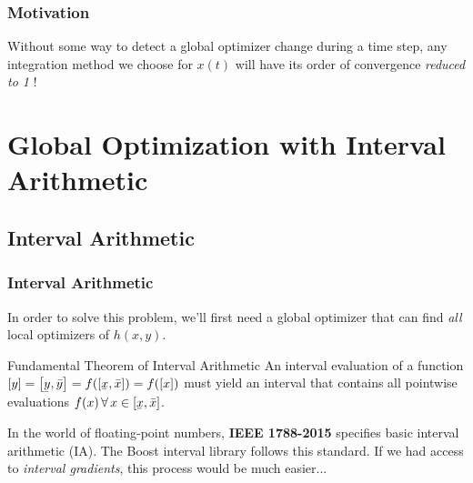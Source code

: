 \documentclass[10pt]{beamer}
\newcommand\ubar[1]{\underaccent{\bar}{#1}}
\begin{document}
\begin{frame}
	\frametitle{Motivation}
	\vfill
	Without some way to detect a global optimizer change during a time step, any integration method we choose for $x(t)$ will have its order of convergence \textit{reduced to 1} \supercite{mannshardtOnestepMethodsAny1978}!
	\vfill
\end{frame}

\section{Global Optimization with Interval Arithmetic}

\subsection{Interval Arithmetic}
\begin{frame}
	\frametitle{Interval Arithmetic}
	In order to solve this problem, we'll first need a global optimizer that can find \textit{all} local optimizers of $h(x, y)$.
	\vfill
	\begin{block}{Fundamental Theorem of Interval Arithmetic \supercite{hickeyIntervalArithmeticPrinciples2001}} 
		An interval evaluation of a function $\left[y\right] = \left[\ubar{y},\bar{y}\right] = f(\left[\ubar x, \bar x\right])=f([x])$ must yield an interval that contains all pointwise evaluations $f(x)\,\forall\,x\in\left[\ubar x, \bar x\right]$.
	\end{block}
	In the world of floating-point numbers, \textbf{IEEE 1788-2015} specifies basic interval arithmetic (IA). The Boost interval library\supercite{melquiondBoostIntervalLibrary2022} follows this standard.
	\vfill
	\vfill
	If we had access to \textit{interval gradients}, this process would be much easier...
	\vfill
\end{frame}
\end{document}
